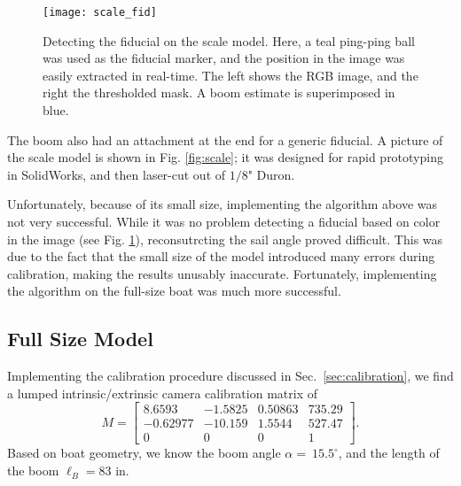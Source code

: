 \documentclass[letterpaper, 10 pt, conference]{ieeeconf}  %
\begin{document}
\begin{figure}[htbp]
  \centering
   \texttt{[image: scale\_fid]} 
  \caption{Detecting the fiducial on the scale model. Here, a teal ping-ping ball was used as the fiducial marker, and the position in the image was easily extracted in real-time. The left shows the RGB image, and the right the thresholded mask. A boom estimate is superimposed in blue.}
   \label{fig:scale_fid}
\end{figure}

The boom also had an attachment at the end for a generic fiducial. A picture of the scale model is shown in Fig. \ref{fig:scale}; it was designed for rapid prototyping in SolidWorks, and then laser-cut out of $1/8$" Duron. 

Unfortunately, because of its small size, implementing the algorithm above was not very successful. While it was no problem detecting a fiducial based on color in the image (see Fig. \ref{fig:scale_fid}), reconsutrcting the sail angle proved difficult. This was due to the fact that the small size of the model introduced many errors during calibration, making the results unusably inaccurate. Fortunately, implementing the algorithm on the full-size boat was much more successful. 
\subsection{Full Size Model}
Implementing the calibration procedure discussed in Sec.~\ref{sec:calibration}, we find a lumped intrinsic/extrinsic camera calibration matrix of
\[
M = \left[\begin{array}{cccc}
8.6593 & -1.5825 & 0.50863 & 735.29 \\
-0.62977 & -10.159 & 1.5544 & 527.47 \\
0 & 0 & 0& 1   \end{array}\right].
\]
Based on boat geometry, we know the boom angle $\alpha=~15.5^\circ$, and the length of the boom $\ell_B = 83$ in. 
\end{document}
